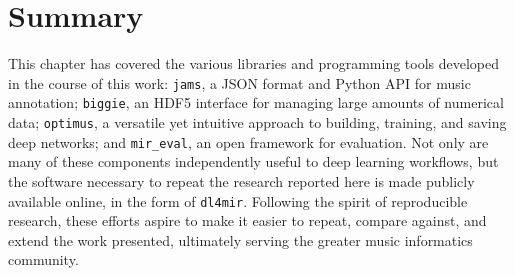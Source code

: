 \section{Summary}
\label{sec:summary}

This chapter has covered the various libraries and programming tools developed in the course of this work:
\texttt{jams}, a JSON format and Python API for music annotation;
\texttt{biggie}, an HDF5 interface for managing large amounts of numerical data;
\texttt{optimus}, a versatile yet intuitive approach to building, training, and saving deep networks;
and \texttt{mir\_eval}, an open framework for evaluation.
Not only are many of these components independently useful to deep learning workflows, but the software necessary to repeat the research reported here is made publicly available online, in the form of \texttt{dl4mir}.
Following the spirit of reproducible research, these efforts aspire to make it easier to repeat, compare against, and extend the work presented, ultimately serving the greater music informatics community.
